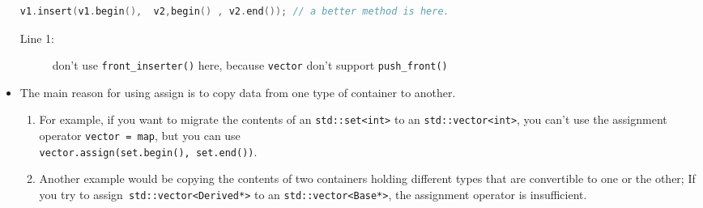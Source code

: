 \documentclass[a4paper,11pt,twoside]{book}
\begin{document}
\begin{itemize}
\begin{lstlisting}[frame=single, language=c++]
v1.insert(v1.begin(),  v2,begin() , v2.end()); // a better method is here.
\end{lstlisting}
\begin{description}
	\item[Line 1:] don't use \texttt{front\_inserter()} here, because \texttt{vector} don't support \texttt{push\_front()}
\end{description}

\item The main reason for using assign is to copy data from one type of container to another.
\begin{enumerate}
	
	\item For example, if you want to migrate the contents of an \texttt{std::set<int>} to an \texttt{std::vector<int>}, you can't use the assignment operator \texttt{vector = map}, but you can use \\ \texttt{vector.assign(set.begin(), set.end())}.

	\item Another example would be copying the contents of two containers holding different types that are convertible to one or the other; If you try to assign\texttt{ std::vector<Derived*>} to an \texttt{std::vector<Base*>}, the assignment operator is insufficient.

\end{enumerate}

\end{itemize}
\end{document}
